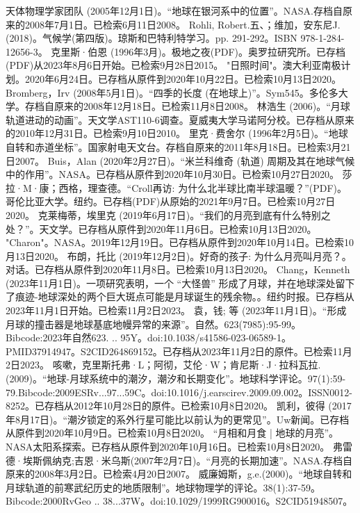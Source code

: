 \begin{enumerate}
 天体物理学家团队 (2005年12月1日)。“地球在银河系中的位置”。NASA.存档自原来的2008年7月1日。已检索6月11日2008。
 Rohli, Robert.五、；维加，安东尼J.(2018)。气候学(第四版)。琼斯和巴特利特学习。pp. 291-292。ISBN 978-1-284-12656-3。
 克里斯·伯恩 (1996年3月)。极地之夜(PDF)。奥罗拉研究所。已存档(PDF)从2023年8月6日开始。已检索9月28日2015。
 "日照时间"。澳大利亚南极计划。2020年6月24日。已存档从原件到2020年10月22日。已检索10月13日2020。
 Bromberg，Irv (2008年5月1日)。“四季的长度 (在地球上)”。Sym545。多伦多大学。存档自原来的2008年12月18日。已检索11月8日2008。
 林浩生 (2006)。“月球轨道进动的动画”。天文学AST110-6调查。夏威夷大学马诺阿分校。已存档从原来的2010年12月31日。已检索9月10日2010。
 里克·费舍尔 (1996年2月5日)。“地球自转和赤道坐标”。国家射电天文台。存档自原来的2011年8月18日。已检索3月21日2007。
 Buis，Alan (2020年2月27日)。“米兰科维奇 (轨道) 周期及其在地球气候中的作用”。NASA。已存档从原件到2020年10月30日。已检索10月27日2020。
 莎拉·M·康；西格，理查德。“Croll再访: 为什么北半球比南半球温暖？”(PDF)。哥伦比亚大学。纽约。已存档(PDF)从原始的2021年9月7日。已检索10月27日2020。
 克莱梅蒂，埃里克 (2019年6月17日)。“我们的月亮到底有什么特别之处？”。天文学。已存档从原件到2020年11月6日。已检索10月13日2020。
 "Charon"。NASA。2019年12月19日。已存档从原件到2020年10月14日。已检索10月13日2020。
 布朗，托比 (2019年12月2日)。好奇的孩子: 为什么月亮叫月亮？。对话。已存档从原件到2020年11月8日。已检索10月13日2020。
 Chang，Kenneth (2023年11月1日)。一项研究表明，一个 “大怪兽” 形成了月球，并在地球深处留下了痕迹-地球深处的两个巨大斑点可能是月球诞生的残余物。。纽约时报。已存档从2023年11月1日开始。已检索11月2日2023。
 袁，钱; 等 (2023年11月1日)。“形成月球的撞击器是地球基底地幔异常的来源”。自然。623(7985):95-99。Bibcode:2023年自然623. .. 95Y。doi:10.1038/s41586-023-06589-1。PMID37914947。S2CID264869152。已存档从2023年11月2日的原件。已检索11月2日2023。  
 咳嗽，克里斯托弗·L；阿彻，艾伦·W；肯尼斯·J·拉科瓦拉.(2009)。“地球-月球系统中的潮汐，潮汐和长期变化”。地球科学评论。97(1):59-79.Bibcode:2009ESRv...97...59C。doi:10.1016/j.earscirev.2009.09.002。ISSN0012-8252。已存档从2012年10月28日的原件。已检索10月8日2020。 
 凯利，彼得 (2017年8月17日)。“潮汐锁定的系外行星可能比以前认为的更常见”。Uw新闻。已存档从原件到2020年10月9日。已检索10月8日2020。
 “月相和月食 | 地球的月亮”。NASA太阳系探索。已存档从原件到2020年10月16日。已检索10月8日2020。
 弗雷德·埃斯佩纳克;吉恩·米乌斯(2007年2月7日)。“月亮的长期加速”。NASA.存档自原来的2008年3月2日。已检索4月20日2007。
 威廉姆斯，g.e.(2000)。“地球自转和月球轨道的前寒武纪历史的地质限制”。地球物理学的评论。38(1):37-59。Bibcode:2000RvGeo .. 38...37W。doi:10.1029/1999RG900016。S2CID51948507。 

\end{enumerate}
